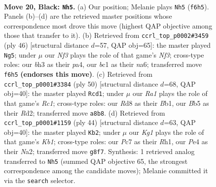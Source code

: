 \documentclass[11pt]{article}
\begin{document}
\clearpage

\begin{figure}[p]\centering
\begin{subfigure}{0.46\textwidth}\centering
\resizebox{\linewidth}{!}{%
\newchessgame
\chessboard[
  setfen={r2r2k1/P1p3bp/1p3np1/1b3p2/4pP1P/6PB/4P3/RNB1R1K1 b - - 1 20},
  showmover=false,
  pgfstyle=straightmove, color=movearrow, markmove={f6-h5}
]}
\caption{}
\end{subfigure}\hfill
\begin{subfigure}{0.46\textwidth}\centering
\resizebox{\linewidth}{!}{%
\newchessgame
\chessboard[
  setfen={r1b1r1k1/1p3p2/n1pR2p1/4P2p/p1P2P2/1P3N1P/P5B1/3R2K1 w - - 0 24},
  showmover=false,
  pgfstyle=straightmove, color=movearrow, markmove={f3-g5}
]}
\caption{}
\end{subfigure}
\\[4pt]
\begin{subfigure}{0.46\textwidth}\centering
\resizebox{\linewidth}{!}{%
\newchessgame
\chessboard[
  setfen={2r5/1p6/pbnr4/3pk1pp/4p3/P3P2P/1P1RNPP1/1BR3K1 w - - 2 26},
  showmover=false,
  pgfstyle=straightmove, color=movearrow, markmove={c1-d1}
]}
\caption{}
\end{subfigure}\hfill
\begin{subfigure}{0.46\textwidth}\centering
\resizebox{\linewidth}{!}{%
\newchessgame
\chessboard[
  setfen={1rr3k1/5p2/2b1pbp1/pp6/1P2P3/P1PB1P2/N5P1/1K1R3R w - - 0 23},
  showmover=false,
  pgfstyle=straightmove, color=movearrow, markmove={b1-b2}
]}
\caption{}
\end{subfigure}
\caption{\textbf{Move 20, Black: \texttt{Nh5}.} (a) Our position; Melanie plays \texttt{Nh5} (\texttt{f6h5}). Panels (b)--(d) are the retrieved master positions whose correspondence most drove this move (highest QAP objective among those that transfer to it). (b) Retrieved from \texttt{ccrl\_top\_p0002\#3459} (ply 46) [structural distance $d$=57, QAP obj=65]: the master played \texttt{Ng5}; under $\mu$ our \emph{Nf3} plays the role of that game's \emph{Nf3}; cross-type roles: our \emph{b}h3 as their \emph{p}a4, our \emph{b}c1 as their \emph{n}a6; transferred move \texttt{f6h5} \textbf{(endorses this move)}. (c) Retrieved from \texttt{ccrl\_top\_p0001\#3384} (ply 50) [structural distance $d$=68, QAP obj=40]: the master played \texttt{Rcd1}; under $\mu$ our \emph{Ra1} plays the role of that game's \emph{Rc1}; cross-type roles: our \emph{R}d8 as their \emph{B}b1, our \emph{B}b5 as their \emph{R}d2; transferred move \texttt{a8b8}. (d) Retrieved from \texttt{ccrl\_top\_p0001\#1159} (ply 44) [structural distance $d$=63, QAP obj=40]: the master played \texttt{Kb2}; under $\mu$ our \emph{Kg1} plays the role of that game's \emph{Kb1}; cross-type roles: our \emph{P}c7 as their \emph{R}h1, our \emph{P}e4 as their \emph{N}a2; transferred move \texttt{g8f7}. Synthesis: 1 retrieved analog transferred to \texttt{Nh5} (summed QAP objective 65, the strongest correspondence among the candidate moves); Melanie committed it via the \texttt{search} selector.}
\label{fig:thought-m39}
\end{figure}
\end{document}
